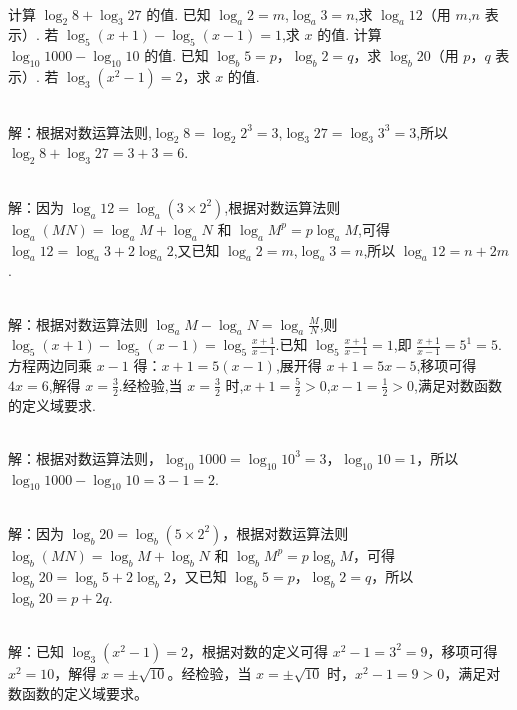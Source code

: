 \documentclass{ctexart}
\newenvironment{MyAnswer}[1][] %
{
    \begin{tcolorbox}[breakable, colframe=blue]
    \begin{Answer}[#1] \color{blue} \kaishu
        }  %
    {\end{Answer}
\end{tcolorbox}
}
\begin{document}
\
\begin{Exercise}[title={对数运算小练习1}, label={ex:logarithm}]
    \Question 计算 $\log_2 8 + \log_3 27$ 的值.
    \Question 已知 $\log_a 2 = m$,$\log_a 3 = n$,求 $\log_a 12$（用 $m$,$n$ 表示）.
    \Question 若 $\log_5 (x + 1) - \log_5 (x - 1) = 1$,求 $x$ 的值.
    \Question 计算 $\log_{10} 1000 - \log_{10} 10$ 的值.
    \Question 已知 $\log_b 5 = p$，$\log_b 2 = q$，求 $\log_b 20$（用 $p$，$q$ 表示）.
    \Question 若 $\log_3 (x^2 - 1) = 2$，求 $x$ 的值.
\end{Exercise}
\begin{MyAnswer}[ref={ex:logarithm}]
        \Question {}\\ 解：根据对数运算法则,$\log_2 8=\log_2 2^3 = 3$,$\log_3 27=\log_3 3^3 = 3$,所以 $\log_2 8+\log_3 27=3 + 3=6$.

        \Question {}\\ 解：因为 $\log_a 12=\log_a(3\times2^2)$,根据对数运算法则 $\log_a(MN)=\log_a M+\log_a N$ 和 $\log_a M^p = p\log_a M$,可得 $\log_a 12=\log_a 3 + 2\log_a 2$,又已知 $\log_a 2 = m$,$\log_a 3 = n$,所以 $\log_a 12=n + 2m$.

        \Question  {}\\  解：根据对数运算法则 $\log_a M-\log_a N=\log_a\frac{M}{N}$,则 $\log_5 (x + 1)-\log_5 (x - 1)=\log_5\frac{x + 1}{x - 1}$.已知 $\log_5\frac{x + 1}{x - 1}=1$,即 $\frac{x + 1}{x - 1}=5^1 = 5$.
        方程两边同乘 $x - 1$ 得：$x + 1 = 5(x - 1)$,展开得 $x + 1 = 5x-5$,移项可得 $4x = 6$,解得 $x=\frac{3}{2}$.经检验,当 $x=\frac{3}{2}$ 时,$x + 1=\frac{5}{2}>0$,$x - 1=\frac{1}{2}>0$,满足对数函数的定义域要求.

        \Question {}\\ 解：根据对数运算法则，$\log_{10} 1000=\log_{10} 10^3 = 3$，$\log_{10} 10 = 1$，所以 $\log_{10} 1000 - \log_{10} 10=3 - 1 = 2$.

        \Question {}\\ 解：因为 $\log_b 20=\log_b(5\times2^2)$，根据对数运算法则 $\log_b(MN)=\log_b M+\log_b N$ 和 $\log_b M^p = p\log_b M$，可得 $\log_b 20=\log_b 5 + 2\log_b 2$，又已知 $\log_b 5 = p$，$\log_b 2 = q$，所以 $\log_b 20=p + 2q$.

        \Question {}\\ 解：已知 $\log_3 (x^2 - 1) = 2$，根据对数的定义可得 $x^2 - 1 = 3^2 = 9$，移项可得 $x^2 = 10$，解得 $x=\pm\sqrt{10}$。经检验，当 $x=\pm\sqrt{10}$ 时，$x^2 - 1 = 9>0$，满足对数函数的定义域要求。
\end{MyAnswer}
\end{document}
